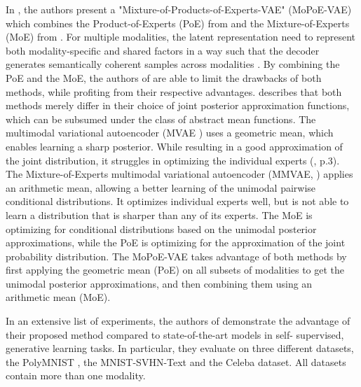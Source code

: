 	In \cite{thomas_gener-ELBO}, the authors present a "Mixture-of-Products-of-Experts-VAE" (MoPoE-VAE) which combines the Product-of-Experts (PoE) from \cite{wu2018multimodal} and the Mixture-of-Experts (MoE) from \cite{shi2019variational}.
	For multiple modalities, the latent representation need to represent both modality-specific and shared factors in a way such that the decoder generates semantically coherent samples across modalities \cite{shi2019variational}.
	By combining the PoE and the MoE, the authors of \cite{thomas_gener-ELBO} are able to limit the drawbacks of both methods, while profiting from their respective advantages.
	\cite{thomas_gener-ELBO} describes that both methods merely differ in their choice of joint posterior approximation functions, which can be subsumed under the class of abstract mean functions.
	The multimodal variational autoencoder (MVAE \cite{wu2018multimodal}) uses a geometric mean, which enables learning a sharp posterior.
	While resulting in a good approximation of the joint distribution, it struggles in optimizing the individual experts (\cite{wu2018multimodal}, p.3).
	The Mixture-of-Experts multimodal variational autoencoder (MMVAE, \cite{shi2019variational}) applies an arithmetic mean, allowing a better learning of the unimodal pairwise conditional distributions.
	It optimizes individual experts well, but is not able to learn a distribution that is sharper than any of its experts.
	The MoE is optimizing for conditional distributions based on the unimodal posterior approximations, while the PoE is optimizing for the approximation of the joint probability distribution.
	The MoPoE-VAE takes advantage of both methods by first applying the geometric mean (PoE) on all subsets of modalities to get the unimodal posterior approximations, and then combining them using an arithmetic mean (MoE).

	In an extensive list of experiments, the authors of \cite{thomas_gener-ELBO} demonstrate the advantage of their proposed method compared to state-of-the-art models in self- supervised, generative learning tasks.
	In particular, they evaluate on three different datasets, the PolyMNIST \cite{thomas_gener-ELBO}, the MNIST-SVHN-Text \cite{thomas_multimodal} and the Celeba dataset.
	All datasets contain more than one modality.




